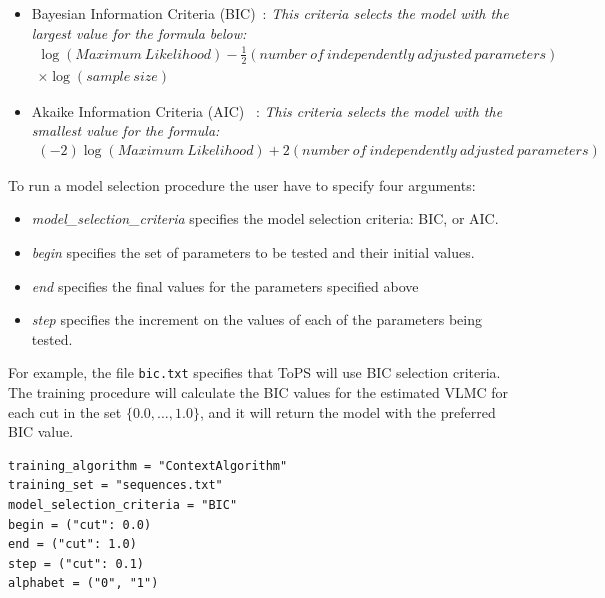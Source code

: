 \documentclass[10pt]{article}
\begin{document}
\vspace{1em}
\begin{minipage}{\textwidth}
\begin{itemize}
\item  Bayesian Information Criteria (BIC)~\cite{Schwarz1978}: \textit{This criteria selects the model with the largest value for the formula below:}
\begin{align*}
\log (Maximum~Likelihood) - \frac{1}{2} (number~of~independently~adjusted~parameters) \\ \times \log (sample~size)
\end{align*}
\vspace{1em}

\item Akaike Information Criteria (AIC) ~\cite{Akaike1974}: \textit{This criteria selects the model with the smallest value for the formula:}
\begin{align*}
(-2) \log (Maximum~Likelihood) + 2  (number~of~independently~adjusted~parameters)
\end{align*}
\end{itemize}
\end{minipage}
\vspace{1em}

To run a model selection procedure the user have to specify four arguments:

\begin{itemize}
\item \textit{model\_selection\_criteria} specifies the model selection criteria: BIC, or AIC.
\item \textit{begin} specifies the set of parameters to be tested and their initial values.
\item \textit{end} specifies  the final values for the parameters specified above
\item \textit{step} specifies the increment on the values of each of the parameters being tested.
\end{itemize}


For example, the file \texttt{bic.txt} specifies that ToPS will use BIC selection criteria. The training procedure will calculate the BIC values for the estimated VLMC for each  cut in the set $\{0.0,...,1.0\}$, and it will return the model with the preferred BIC value.


\vspace{1em}
\begin{minipage}{\textwidth}
\begin{Verbatim}[frame=single,  label={bic.txt}]
training_algorithm = "ContextAlgorithm"
training_set = "sequences.txt"
model_selection_criteria = "BIC"
begin = ("cut": 0.0)
end = ("cut": 1.0)
step = ("cut": 0.1)
alphabet = ("0", "1")
\end{Verbatim}
\end{minipage}
\vspace{1em}
\end{document}
